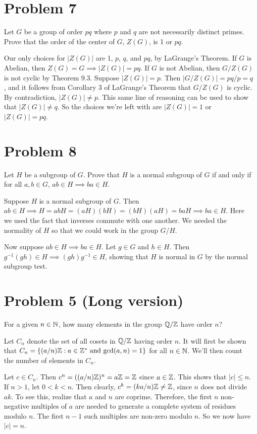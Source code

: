 \documentclass{article}
\begin{document}
\section*{Problem 7}

Let $G$ be a group of order $pq$ where $p$ and $q$ are not necessarily distinct primes.
Prove that the order of the center of $G$, $Z(G)$, is 1 or $pq$.

Our only choices for $|Z(G)|$ are 1, $p$, $q$, and $pq$, by LaGrange's Theorem.
If $G$ is Abelian, then $Z(G)=G\implies |Z(G)|=pq$.
If $G$ is not Abelian, then $G/Z(G)$ is not cyclic by Theorem 9.3.
Suppose $|Z(G)|=p$.  Then $|G/Z(G)|=pq/p=q$, and it follows from
Corollary 3 of LaGrange's Theorem that $G/Z(G)$ is cyclic.
By contradiction, $|Z(G)|\neq p$.  This same line of reasoning
can be used to show that $|Z(G)|\neq q$.  So the choices we're left with are
$|Z(G)|=1$ or $|Z(G)|=pq$.

\pagebreak
\section*{Problem 8}

Let $H$ be a subgroup of $G$.  Prove that $H$ is a normal subgroup of $G$
if and only if for all $a,b\in G$, $ab\in H\implies ba\in H$.

Suppose $H$ is a normal subgroup of $G$.
Then $ab\in H\implies H=abH=(aH)(bH)=(bH)(aH)=baH\implies ba\in H$.
Here we used the fact that inverses commute with one another.
We needed the normality of $H$ so that we could work in the group $G/H$.

Now suppose $ab\in H\implies ba\in H$.  
Let $g\in G$ and $h\in H$.  Then $g^{-1}(gh)\in H\implies (gh)g^{-1}\in H$,
showing that $H$ is normal in $G$ by the normal subgroup test.

\section*{Problem 5 (Long version)}

For a given $n\in\mathbb{N}$, how many elements in the group
$\mathbb{Q}/\mathbb{Z}$ have order $n$?

Let $C_n$ denote the set of all cosets in $\mathbb{Q}/\mathbb{Z}$ having order $n$.
It will first be shown that
$C_n=\{(a/n)\mathbb{Z}:\mbox{$a\in\mathbb{Z}^*$ and $\gcd(a,n)=1$}\}$ for all $n\in\mathbb{N}$.
We'll then count the number of elements in $C_n$.

Let $c\in C_n$.  Then $c^n=((a/n)\mathbb{Z})^n=a\mathbb{Z}=\mathbb{Z}$ since $a\in\mathbb{Z}$.
This shows that $|c|\leq n$.  If $n>1$, let $0<k<n$.
Then clearly, $c^k=(ka/n)\mathbb{Z}\neq\mathbb{Z}$, since $n$ does not divide $ak$.
To see this, realize that $a$ and $n$ are coprime.  Therefore, the first $n$
non-negative multiples of $a$ are needed to generate a complete system
of residues modulo $n$.
The first $n-1$ such multiples are non-zero modulo $n$.
So we now have $|c|=n$.
\end{document}
